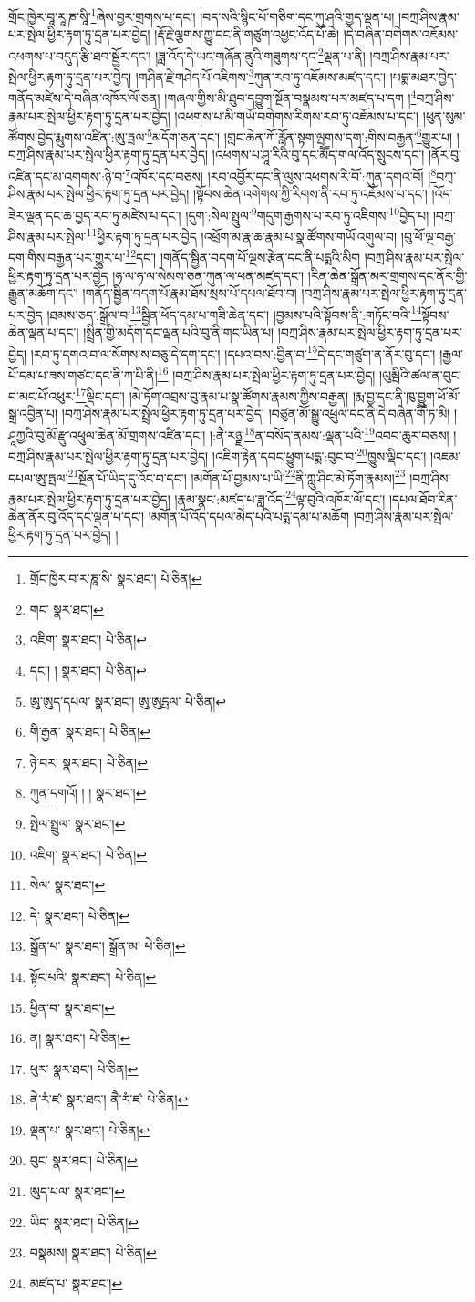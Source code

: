 གྲོང་ཁྱེར་བཱ་རཱ་ཎ་སཱི་\footnote{གྲོང་ཁྱེར་བ་ར་ཎཱ་སི་  སྣར་ཐང་།  པེ་ཅིན། }ཞེས་བྱར་གྲགས་པ་དང་། །བད་སའི་སྙིང་པོ་གཅིག་དང་ཀུ་ཤའི་གྱད་ལྡན་པ། །བཀྲ་ཤིས་རྣམ་པར་སྤེལ་ཕྱིར་རྟག་ཏུ་དྲན་པར་བྱེད། །རྡོ་རྗེ་ལྕགས་ཀྱུ་དང་ནི་གཙུག་འཕྱང་འོད་པོ་ཆེ། །དེ་བཞིན་བགེགས་འཇོམས་འཕགས་པ་བདུད་རྩི་ཐབ་སྦྱོར་དང་། །ཟླ་འོད་དེ་ཡང་གཞོན་ནུའི་གཟུགས་དང་\footnote{གང་  སྣར་ཐང་། }ལྡན་པ་ནི། །བཀྲ་ཤིས་རྣམ་པར་སྤེལ་ཕྱིར་རྟག་ཏུ་དྲན་པར་བྱེད། །གཤིན་རྗེ་གཤེད་པོ་འཇིགས་\footnote{འཇིག་  སྣར་ཐང་།  པེ་ཅིན། }ཀུན་རབ་ཏུ་འཇོམས་མཛད་དང་། །པདྨ་མཐར་བྱེད་གནོད་མཛེས་དེ་བཞིན་འཁོར་ལོ་ཅན། །གཞལ་གྱིས་མི་ཐུབ་དབྱུག་སྔོན་བསྣམས་པར་མཛད་པ་དག །\footnote{དང་། །  སྣར་ཐང་།  པེ་ཅིན། }བཀྲ་ཤིས་རྣམ་པར་སྤེལ་ཕྱིར་རྟག་ཏུ་དྲན་པར་བྱེད། །འཕགས་པ་མི་གཡོ་བགེགས་རིགས་རབ་ཏུ་འཇོམས་པ་དང་། །ཕུན་སུམ་ཚོགས་བྱེད་རྨུགས་འཛིན་:ཨུ་ཏྤལ་\footnote{ཨུ་ཨུད་དཔལ་  སྣར་ཐང་། ཨུ་ཨུདྤལ་  པེ་ཅིན། }མདོག་ཅན་དང་། །གླང་ཆེན་ཀོ་རློན་སྟག་ལྤགས་དག་:གིས་བརྒྱན་\footnote{གི་རྒྱན་  སྣར་ཐང་།  པེ་ཅིན། }གྱུར་པ། །བཀྲ་ཤིས་རྣམ་པར་སྤེལ་ཕྱིར་རྟག་ཏུ་དྲན་པར་བྱེད། །འཕགས་པ་ཤཱ་རིའི་བུ་དང་མཽད་གལ་འོད་སྲུངས་དང་། །ནོར་བུ་འཛིན་དང་མ་འགགས་:ཉེ་བ་\footnote{ཉེ་བར་  སྣར་ཐང་།  པེ་ཅིན། }འཁོར་དང་བཅས། །རབ་འབྱོར་དང་ནི་ལུས་འཕགས་རི་བོ་:ཀུན་དགའ་བོ། །\footnote{ཀུན་དགའོ། ། །  སྣར་ཐང་། }བཀྲ་ཤིས་རྣམ་པར་སྤེལ་ཕྱིར་རྟག་ཏུ་དྲན་པར་བྱེད། །སྟོབས་ཆེན་འགེགས་ཀྱི་རིགས་ནི་རབ་ཏུ་འཇོམས་པ་དང་། །འོད་ཟེར་ལྡན་དང་ཆ་བྱད་རབ་ཏུ་མཛེས་པ་དང་། །དུག་:སེལ་སྤྲུལ་\footnote{སྤེལ་སྤྲུལ་  སྣར་ཐང་། }གདུག་རྒྱགས་པ་རབ་ཏུ་འཇིགས་\footnote{འཇིག་  སྣར་ཐང་།  པེ་ཅིན། }བྱེད་པ། །བཀྲ་ཤིས་རྣམ་པར་སྤེལ་\footnote{སེལ་  སྣར་ཐང་། }ཕྱིར་རྟག་ཏུ་དྲན་པར་བྱེད །འཕྲོག་མ་རྣ་ཆ་རྣམ་པ་སྣ་ཚོགས་གཡོ་འགུལ་བ། །བུ་ཕོ་ལྔ་བརྒྱ་དག་གིས་བརྒྱན་པར་གྱུར་པ་\footnote{དེ་  སྣར་ཐང་།  པེ་ཅིན། }དང་། །གནོད་སྦྱིན་བདག་པོ་ལྔས་རྩེན་དང་ནི་པདྨའི་མིག །བཀྲ་ཤིས་རྣམ་པར་སྤེལ་ཕྱིར་རྟག་ཏུ་དྲན་པར་བྱེད །ཧ་ལ་ཧ་ལ་སེམས་ཅན་ཀུན་ལ་ཕན་མཛད་དང་། །རིན་ཆེན་སྒྲོན་མར་གྲགས་དང་ནོར་གྱི་རྒྱུན་མཆོག་དང་། །གནོད་སྦྱིན་བདག་པོ་རྣམ་ཐོས་སྲས་པོ་དཔལ་ཐོབ་བ། །བཀྲ་ཤིས་རྣམ་པར་སྤེལ་ཕྱིར་རྟག་ཏུ་དྲན་པར་བྱེད །ཐམས་ཅད་:སྒྲོལ་བ་\footnote{སྒྲོན་པ་  སྣར་ཐང་། སྒྲོན་མ་  པེ་ཅིན། }སྦྱིན་ཕོད་དམ་པ་གཟི་ཆེན་དང་། །བྱམས་པའི་སྟོབས་ནི་:གཏོང་བའི་\footnote{སྟོང་པའི་  སྣར་ཐང་།  པེ་ཅིན། }སྟོབས་ཆེན་ལྡན་པ་དང་། །སྤྲིན་གྱི་མདོག་དང་ལྡན་པའི་བུ་ནི་གང་ཡིན་པ། །བཀྲ་ཤིས་རྣམ་པར་སྤེལ་ཕྱིར་རྟག་ཏུ་དྲན་པར་བྱེད། །རབ་ཏུ་དགའ་བ་ལ་སོགས་ས་བཅུ་དེ་དག་དང་། །དཔའ་བས་:བྱིན་བ་\footnote{ཕྱིན་བ་  སྣར་ཐང་། }དེ་དང་གཙུག་ན་ནོར་བུ་དང་། །རྒྱལ་པོ་དམ་པ་ཟས་གཙང་དང་ནི་ཀ་པི་ནི།\footnote{ན།  སྣར་ཐང་།  པེ་ཅིན། } །བཀྲ་ཤིས་རྣམ་པར་སྤེལ་ཕྱིར་རྟག་ཏུ་དྲན་པར་བྱེད། །ལུམྦིའི་ཚལ་ན་བུང་བ་མང་པོ་འཕུར་\footnote{ཕུར་  སྣར་ཐང་།  པེ་ཅིན། }ལྡིང་དང་། །མེ་ཏོག་འབྲས་བུ་རྣམ་པ་སྣ་ཚོགས་རྣམས་ཀྱིས་བརྒྱན། །རྨ་བྱ་དང་ནི་ཁུ་བྱུག་ཕོ་མོ་སྒྲ་འབྱིན་པ། །བཀྲ་ཤེས་རྣམ་པར་སྤྲེལ་ཕྱིར་རྟག་ཏུ་དྲན་པར་བྱེད། །བཙུན་མོ་སྒྱུ་འཕྲུལ་དང་ནི་དེ་བཞིན་གཽ་ཏ་མི། །ཤཱཀྱའི་བུ་མོ་རྫུ་འཕྲུལ་ཆེན་མོ་གྲགས་འཛིན་དང་། །:ནཻ་རཉྫ་\footnote{ནེ་རཾ་ཛ་  སྣར་ཐང་། ནཻ་རཾ་ཛ་  པེ་ཅིན། }ན་བསོད་ནམས་:ལྡན་པའི་\footnote{ལྡན་པ་  སྣར་ཐང་།  པེ་ཅིན། }འབབ་ཆུར་བཅས། །བཀྲ་ཤིས་རྣམ་པར་སྤེལ་ཕྱིར་རྟག་ཏུ་དྲན་པར་བྱེད། །འཇིག་རྟེན་དབང་ཕྱུག་པདྨ་:བུང་བ་\footnote{བུང་  སྣར་ཐང་།  པེ་ཅིན། }ཁྱུས་ལྡིང་དང་། །འཇམ་དཔལ་ཨུ་ཏྤལ་\footnote{ཨུད་པལ་  སྣར་ཐང་། }སྔོན་པོ་ཡིད་དུ་འོང་བ་དང་། །མགོན་པོ་བྱམས་པ་ཡི་\footnote{ཡིད་  སྣར་ཐང་།  པེ་ཅིན། }ནི་ཀླུ་ཤིང་མེ་ཏོག་རྣམས།\footnote{བསྣམས།  སྣར་ཐང་།  པེ་ཅིན། } །བཀྲ་ཤིས་རྣམ་པར་སྤེལ་ཕྱིར་རྟག་ཏུ་དྲན་པར་བྱེད། །རྣམ་སྣང་:མཛད་པ་ཟླ་འོད་\footnote{མཛད་པ་  སྣར་ཐང་། }ལྟ་བུའི་འཁོར་ལོ་དང་། །དཔལ་ཐོབ་རིན་ཆེན་ནོར་བུ་འོད་དང་ལྡན་པ་དང་། །མགོན་པོ་འོད་དཔལ་མེད་པའི་པདྨ་དམ་པ་མཆོག །བཀྲ་ཤིས་རྣམ་པར་སྤེལ་ཕྱིར་རྟག་ཏུ་དྲན་པར་བྱེད། །
